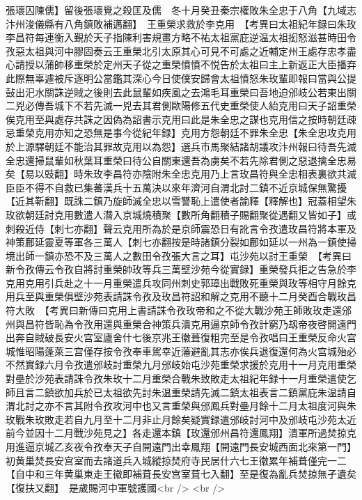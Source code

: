 張瓌囚陳儒】留後張瓌覺之殺匡及儒　冬十月癸丑秦宗權敗朱全忠于八角【九域志汴州浚儀縣有八角鎮敗補邁翻】　王重榮求救於李克用　【考異曰太祖紀年録曰朱玫李昌符每連衡入覲於天子指陳利害規畫方略不祐太祖黨庇逆温太祖抝怒滋甚時田令孜惡太祖與河中膠固奏云王重榮北引太原其心可見不可處之近輔定州王處存忠孝盡心請授以蒲帥移重榮於定州天子從之重榮憤憤不悦告於太祖曰主上新返正大臣播弃此際無辜遽被斥逐明公當鑑其深心今日使僕安歸會太祖憤怒朱玫輩即報曰當與公提鼔出汜水關誅逆賊之後則去此鼠輩如疾風之去鴻毛耳重榮曰吾地迫邠岐公若東出關二兇必傳吾城下不若先滅一兇去其君側歐陽修五代史重榮使人紿克用曰天子詔重榮俟克用至與處存共誅之因偽為詔書示克用曰此是朱全忠之謀也克用信之按時朝廷疎忌重榮克用亦知之恐無是事今從紀年録】克用方怨朝廷不罪朱全忠【朱全忠攻克用於上源驛朝廷不能治其罪故克用以為怨】選兵市馬聚結諸胡議攻汴州報曰待吾先滅全忠還掃鼠輩如秋葉耳重榮曰待公自關東還吾為虜矣不若先除君側之惡退擒全忠易矣【易以豉翻】時朱玫李昌符亦陰附朱全忠克用乃上言玫昌符與全忠相表裏欲共滅臣臣不得不自救已集蕃漢兵十五萬決以來年濟河自渭北討二鎮不近京城保無驚擾【近其靳翻】既誅二鎮乃旋師滅全忠以雪讐恥上遣使者諭釋【釋解也】冠蓋相望朱玫欲朝廷討克用數遣人潛入京城燒積聚【數所角翻積子賜翻聚從遇翻又皆如子】或刺殺近侍【刺七亦翻】聲云克用所為於是京師震恐日有訛言令孜遣玫昌符將本軍及神策鄜延靈夏等軍各三萬人【刺七亦翻按是時諸鎮分裂如鄜如延以一州為一鎮使掃境出師一鎮亦恐不及三萬人之數田令孜張大言之耳】屯沙苑以討王重榮　【考異曰新令孜傳云令孜自將討重榮帥玫等兵三萬壁沙苑今從實録】重榮發兵拒之告急於李克用克用引兵赴之十一月重榮遣兵攻同州刺史郭璋出戰敗死重榮與玫等相守月餘克用兵至與重榮俱壁沙苑表請誅令孜及玫昌符詔和解之克用不聽十二月癸酉合戰玫昌符大敗　【考異曰新傳曰克用上書請誅令孜玫帝和之不從大戰沙苑王師敗玫走還邠州與昌符皆恥為令孜用還與重榮合神策兵潰克用逼京師令孜計窮乃刼帝夜啓開遠門出奔自賊破長安火宫室廬舍什七後京兆王徽葺復粗完至是令孜唱曰王重榮反命火宫城惟昭陽蓬萊三宫僅存按令孜奉車駕幸近藩避亂其志亦俟兵退復還何為火宫城殆必不然實録六月令孜遣邠岐討重榮九月邠岐始屯沙苑重榮求援於克用十一月克用重榮對壘於沙苑表請誅令孜朱玫十二月重榮合戰朱致敗走太祖紀年録十一月重榮遣使乞師且言二鎮欲加兵於已太祖欲先討朱温重榮請先滅二鎮太祖表言二鎮黨庇朱温請自渭北討之亦不言其附令孜攻河中也又言重榮與邠鳳兵對壘月餘十二月太祖度河與朱玫戰朱玫敗走若自九月至十二月非止月餘矣疑實録遣邠岐討河中及邠岐屯沙苑太近前今並因十二月戰沙苑見之】各走還本鎮【玫還邠州昌符還鳳翔】潰軍所過焚掠克用進逼京城乙亥夜令孜奉天子自開遠門出幸鳳翔【開遠門長安城西面北來第一門】初黄巢焚長安宫室而去諸道兵入城縱掠焚府寺民居什六七王徽累年補葺僅完一二【自中和三年黄巢東走王徽即補葺長安宫室葺七入翻】至是復為亂兵焚掠無孑遺矣【復扶又翻】　是歲賜河中軍號護國<br />
<br />
